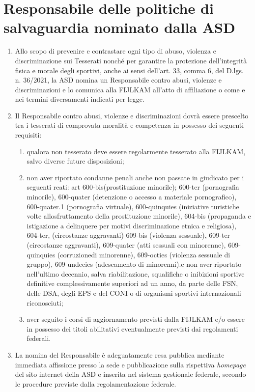 \documentclass{djtsasddoc}
\begin{document}
	\section{Responsabile delle politiche di salvaguardia nominato dalla ASD}
	\begin{enumerate}
		\item Allo scopo di prevenire e contrastare ogni tipo di abuso, violenza e discriminazione sui Tesserati nonché per garantire la protezione dell'integrità fisica e morale degli sportivi, anche ai sensi dell'art. 33, comma 6, del D.lgs. n. 36/2021, la ASD nomina un Responsabile contro abusi, violenze e discriminazioni e lo comunica alla FIJLKAM all'atto di affiliazione o come e nei termini diversamenti indicati per legge.
		\item Il Responsabile contro abusi, violenze e discriminazioni dovrà essere prescelto tra i tesserati di comprovata moralità e competenza in possesso dei seguenti requisiti:
		\begin{enumerate}
			\item qualora non tesserato deve essere regolarmente tesserato alla FIJLKAM, salvo diverse future disposizioni;
			\item non aver riportato condanne penali anche non passate in giudicato per i seguenti reati: art 600-bis(prostituzione minorile); 600-ter (pornografia minorile), 600-quater (detenzione o accesso a materiale pornografico), 600-quater.1 (pornografia virtuale), 600-quinquies (iniziative turistiche volte allosfruttamento della prostituzione minorile), 604-bis (propaganda e istigazione a delinquere per motivi discriminazione etnica e religiosa), 604-ter, (circostanze aggravanti) 609-bis (violenza sessuale), 609-ter (circostanze aggravanti), 609-quater (atti sessuali con minorenne), 609-quinquies (corruzionedi minorenne), 609-octies (violenza sessuale di gruppo), 609-undecies (adescamento di minorenni).c non aver riportato nell'ultimo decennio, salva riabilitazione, squalifiche o inibizioni sportive definitive complessivamente superiori ad un anno, da parte delle FSN, delle DSA, degli EPS e del CONI o di organismi sportivi internazionali riconosciuti;
			\item aver seguito i corsi di aggiornamento previsti dalla FIJLKAM e/o essere in possesso dei titoli abilitativi eventualmente previsti dai regolamenti federali.
		\end{enumerate}
		\item La nomina del Responsabile è adeguatamente resa pubblica mediante immediata affissione presso la sede e pubblicazione sulla rispettiva \textit{homepage} del sito internet della ASD e inserita nel sistema gestionale federale, secondo le procedure previste dalla regolamentazione federale.

\end{enumerate}
\end{document}
